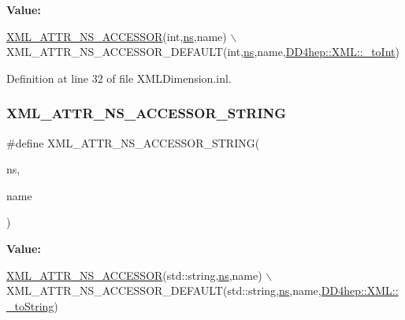 {\bfseries Value\+:}
\begin{DoxyCode}
\hyperlink{_x_m_l_dimension_8inl_a712f343791889ac7912b917b64ccb32a}{XML\_ATTR\_NS\_ACCESSOR}(\textcolor{keywordtype}{int},\hyperlink{namespacedd4hep_af8ce9b988119cb2c9b6b7397dbb34e97}{ns},name)                         \(\backslash\)
  XML\_ATTR\_NS\_ACCESSOR\_DEFAULT(\textcolor{keywordtype}{int},\hyperlink{namespacedd4hep_af8ce9b988119cb2c9b6b7397dbb34e97}{ns},name,\hyperlink{group___d_d4_h_e_p___x_m_l_ga8b2fbc55c4631087c0c5e905327f04d0}{DD4hep::XML::\_toInt})
\end{DoxyCode}


Definition at line 32 of file X\+M\+L\+Dimension.\+inl.

\hypertarget{_x_m_l_dimension_8inl_acd82de7a6fdd451bdc3f3d7665c66899}{}\label{_x_m_l_dimension_8inl_acd82de7a6fdd451bdc3f3d7665c66899} 
\subsubsection{\texorpdfstring{X\+M\+L\+\_\+\+A\+T\+T\+R\+\_\+\+N\+S\+\_\+\+A\+C\+C\+E\+S\+S\+O\+R\+\_\+\+S\+T\+R\+I\+NG}{XML\_ATTR\_NS\_ACCESSOR\_STRING}}
{\footnotesize\ttfamily \#define X\+M\+L\+\_\+\+A\+T\+T\+R\+\_\+\+N\+S\+\_\+\+A\+C\+C\+E\+S\+S\+O\+R\+\_\+\+S\+T\+R\+I\+NG(\begin{DoxyParamCaption}\item[{}]{ns,  }\item[{}]{name }\end{DoxyParamCaption})}

{\bfseries Value\+:}
\begin{DoxyCode}
\hyperlink{_x_m_l_dimension_8inl_a712f343791889ac7912b917b64ccb32a}{XML\_ATTR\_NS\_ACCESSOR}(std::string,\hyperlink{namespacedd4hep_af8ce9b988119cb2c9b6b7397dbb34e97}{ns},name)                 \(\backslash\)
  XML\_ATTR\_NS\_ACCESSOR\_DEFAULT(std::string,\hyperlink{namespacedd4hep_af8ce9b988119cb2c9b6b7397dbb34e97}{ns},name,\hyperlink{group___d_d4_h_e_p___x_m_l_gad2124529d3b80b7896b4d5a370ee906e}{DD4hep::XML::\_toString})
\end{DoxyCode}



